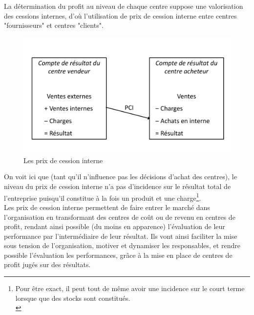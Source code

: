 \documentclass{tufte-handout}
\begin{document}
La détermination du profit au niveau de chaque centre suppose une valorisation des cessions internes, d’où l’utilisation de prix de cession interne entre centres "fournisseurs" et centres "clients".\\
\begin{figure}[htbp]
\centering
\includegraphics[width=.9\linewidth]{./img/pciresult.pdf}
\caption{Les prix de cession interne}
\end{figure}
On voit ici que (tant qu’il n’influence pas les décisions d’achat des centres), le niveau du prix de cession interne n’a pas d’incidence sur le résultat total de l’entreprise puisqu’il constitue à la fois un produit et une charge\footnote{Pour être exact, il peut tout de même avoir une incidence sur le court terme lorsque que des stocks sont constitués.\\}.\\

Les prix de cession interne permettent de faire entrer le marché dans l’organisation en transformant des centres de coût ou de revenu en centres de profit, rendant ainsi possible (du moins en apparence) l’évaluation de leur performance par l’intermédiaire de leur résultat. Ils vont ainsi faciliter la mise sous tension de l’organisation, motiver et dynamiser les responsables, et rendre possible l’évaluation les performances, grâce à la mise en place de centres de profit jugés sur des résultats.\\
\end{document}
